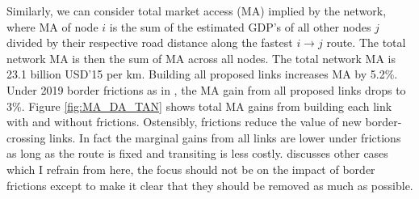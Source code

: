 \documentclass[a4paper]{article}
\begin{document}
Similarly, we can consider total market access (MA) implied by the network, where MA of node $i$ is the sum of the estimated GDP's of all other nodes $j$ divided by their respective road distance along the fastest $i\to j$ route. The total network MA is then the sum of MA across all nodes. The total network MA is 23.1 billion USD'15 per km. Building all proposed links increases MA by 5.2\%. Under 2019 border frictions as in \citet{krantz2024optimal}, the MA gain from all proposed links drops to 3\%. Figure \ref{fig:MA_DA_TAN} shows total MA gains from building each link with and without frictions. Ostensibly, frictions reduce the value of new border-crossing links. In fact the marginal gains from all links are lower under frictions as long as the route is fixed and transiting is less costly.  \citet{krantz2024optimal} discusses other cases which I refrain from here, the focus should not be on the impact of border frictions except to make it clear that they should be removed as much as possible. 
\end{document}
